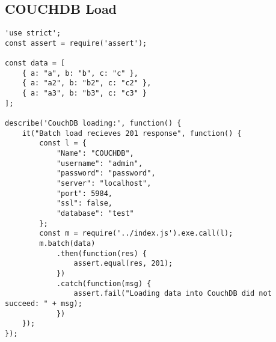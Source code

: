 \subsection{COUCHDB Load}
\label{COUCHDB-tests}
\begin{verbatim}
'use strict';
const assert = require('assert');

const data = [
    { a: "a", b: "b", c: "c" },
    { a: "a2", b: "b2", c: "c2" },
    { a: "a3", b: "b3", c: "c3" }
];

describe('CouchDB loading:', function() {
    it("Batch load recieves 201 response", function() {
        const l = {
            "Name": "COUCHDB",
            "username": "admin",
            "password": "password",
            "server": "localhost",
            "port": 5984,
            "ssl": false,
            "database": "test"
        };
        const m = require('../index.js').exe.call(l);
        m.batch(data)
            .then(function(res) {
                assert.equal(res, 201);
            })
            .catch(function(msg) {
                assert.fail("Loading data into CouchDB did not succeed: " + msg);
            })
    });
});
\end{verbatim}